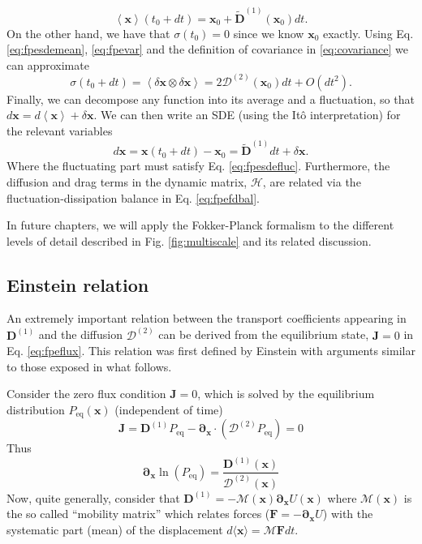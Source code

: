 \documentclass[ twoside,openright,titlepage,numbers=noenddot,%
headinclude,footinclude,cleardoublepage=empty,abstract=on,
BCOR=5mm,paper=b5,fontsize=11pt, dvipsnames
]{scrreprt}
\renewcommand{\vec}[1]{\bm{#1}}
\newcommand{\tens}[1]{\bm{\mathcal{#1}}}
\begin{document}
\begin{equation}
  \label{eq:fpesdemean}
  \left\langle \vec{x}\right\rangle(t_0+dt) = \vec{x}_0 + \widetilde{\vec{D}}^{(1)}(\vec{x}_0)dt.
\end{equation}
On the other hand, we have that $\tens{\sigma}(t_0) = 0$ since we know $\vec{x}_0$ exactly. Using Eq. \eqref{eq:fpesdemean}, \eqref{eq:fpevar} and the definition of covariance in \eqref{eq:covariance} we can approximate
\begin{equation}
  \label{eq:fpesdefluc}
    \tens{\sigma}(t_0+dt) = \left\langle \delta\vec{x}\otimes\delta\vec{x}\right\rangle = 2\tens{D}^{(2)}(\vec{x}_0)dt + O(dt^2).
\end{equation}
Finally, we can decompose any function into its average and a fluctuation, so that $d\vec{x} = d\left\langle\vec{x}\right\rangle + \delta\vec{x}$. We can then write an \gls{SDE} (using the Itô interpretation\cite{Cohen2015}) for the relevant variables
\begin{equation}
  \label{eq:fpesde}
  d\vec{x} = \vec{x}(t_0 + dt) - \vec{x}_0 = \widetilde{\vec{D}}^{(1)}dt + \delta\vec{x}.
\end{equation}
Where the fluctuating part must satisfy Eq. \eqref{eq:fpesdefluc}. Furthermore, the diffusion and drag terms in the dynamic matrix, $\tens{H}$, are related via the fluctuation-dissipation balance in Eq. \eqref{eq:fpefdbal}.

In future chapters, we will apply the Fokker-Planck formalism to the different levels of detail described in Fig. \ref{fig:multiscale} and its related discussion.
\subsection{Einstein relation}\label{sec:einstein}
An extremely important relation between the transport coefficients appearing in $\vec{D}^{(1)}$ and the diffusion $\tens{D}^{(2)}$ can be derived from the equilibrium state, $\vec{J} = 0$ in Eq. \eqref{eq:fpeflux}. This relation was first defined by Einstein\cite{Einstein1905} with arguments similar to those exposed in what follows.

Consider the zero flux condition $\vec{J}=0$, which is solved by the equilibrium distribution $P_{\text{eq}}(\vec{x})$ (independent of time)
\begin{equation}
  \label{eq:fluxeq}
  \vec{J} = \vec{D}^{(1)}P_{\text{eq}} - \vec{\partial}_{\vec{x}}\cdot\left(\tens{D}^{(2)}P_{\text{eq}}\right) = 0
\end{equation}
Thus
\begin{equation}
  \label{eq:fluxeqln}
\vec{\partial}_{\vec{x}}\ln \left(P_{\text{eq}}\right) = \frac{\vec{D}^{(1)}(\vec{x})}{\tens{D}^{(2)}(\vec{x})}
\end{equation}
Now, quite generally, consider that $\vec{D}^{(1)} = -\tens{M}(\vec{x})\vec{\partial}_{\vec{x}}U(\vec{x})$ where $\tens{M}(\vec{x})$ is the so called ``mobility matrix'' which relates forces ($\vec{F} = -\vec{\partial}_{\vec{x}}U$) with the systematic part (mean) of the displacement $d\langle\vec{x}\rangle = \tens{M}\vec{F} dt$.
\end{document}
